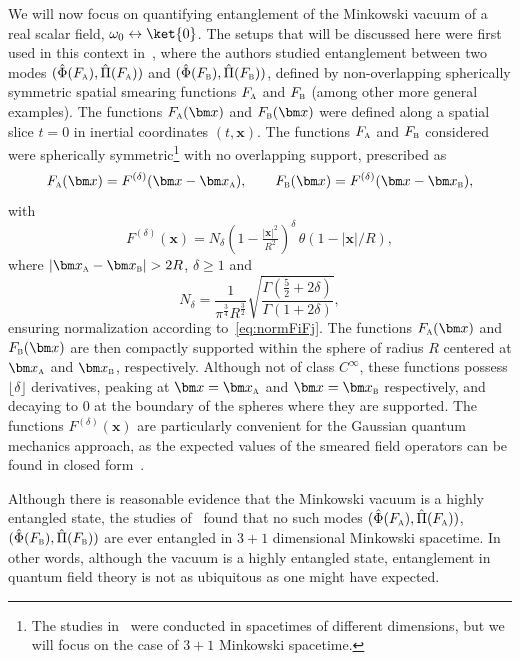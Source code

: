 \documentclass[letterpaper,12pt,titlepage,oneside,final]{book}
\newcommand{\tc}[1]{\textsc{#1}}
\begin{document}
We will now focus on quantifying entanglement of the Minkowski vacuum of a real scalar field, $\omega_0\leftrightarrow \ket{0}$. The setups that will be discussed here were first used in this context in~\cite{ubiquitous}, where the authors studied entanglement between two modes $(\hat{\Phi}(F_\tc{a}),\hat{\Pi}(F_\tc{a}))$ and $(\hat{\Phi}(F_\tc{b}),\hat{\Pi}(F_\tc{b}))$, defined by non-overlapping spherically symmetric spatial smearing functions $F_\tc{a}$ and $F_\tc{b}$ (among other more general examples). The functions $F_\tc{a}(\bm x)$ and $F_\tc{b}(\bm x)$ were defined along a spatial slice $t = 0$ in inertial coordinates $(t,\bm x)$. The functions $F_\tc{a}$ and $F_\tc{b}$ considered were spherically symmetric\footnote{The studies in~\cite{ubiquitous} were conducted in spacetimes of different dimensions, but we will focus on the case of $3+1$ Minkowski spacetime.} with no overlapping support, prescribed as
\begin{equation}\label{eq:FAFB}
    F_\tc{a}(\bm x) = F^{(\delta)}(\bm x - \bm x_\tc{a}), \quad \quad F_\tc{b}(\bm x) = F^{(\delta)}(\bm x - \bm x_\tc{b}),
\end{equation}
with
\begin{equation}\label{Eq: smearing family}
    F^{(\delta)}(\bm x) = N_\delta \left(  1 - \tfrac{|\bm x|^2}{R^2} \right)^{\!\delta} \, \theta\left( 1- |\bm x|/R \right),
\end{equation}
where $|\bm x_\tc{a} - \bm x_{\tc{b}}|>2R$, $\delta\geq 1$ and
\begin{equation}\label{Eq: A_delta}
N_\delta = \frac{1}{\pi^{\frac{3}{4}} R^\frac{3}{2}}\sqrt{\frac{\Gamma(\tfrac{5}{2}+2\delta)}{\Gamma(1+2\delta)}},
\end{equation}
ensuring normalization according to~\eqref{eq:normFiFj}. The functions $F_\tc{a}(\bm x)$ and $F_\tc{b}(\bm x)$ are then compactly supported within the sphere of radius $R$ centered at $\bm x_\tc{a}$ and $\bm x_\tc{b}$, respectively. Although not of class $C^\infty$, these functions possess $\lfloor \delta\rfloor$ derivatives, peaking at $\bm x = \bm x_\tc{a}$ and $\bm x = \bm x_\tc{b}$ respectively, and decaying to $0$ at the boundary of the spheres where they are supported. The functions $F^{(\delta)}(\bm x)$ are particularly convenient for the Gaussian quantum mechanics approach, as the expected values of the smeared field operators can be found in closed form~\cite{ubiquitous}. 

Although there is reasonable evidence that the Minkowski vacuum is a highly entangled state, the studies of~\cite{ubiquitous} found that no such modes $(\hat{\Phi}(F_\tc{a}),\hat{\Pi}(F_\tc{a}))$, $(\hat{\Phi}(F_\tc{b}),\hat{\Pi}(F_\tc{b}))$ are ever entangled in $3+1$ dimensional Minkowski spacetime. In other words, although the vacuum is a highly entangled state, entanglement in quantum field theory is not as ubiquitous as one might have expected.
\end{document}
